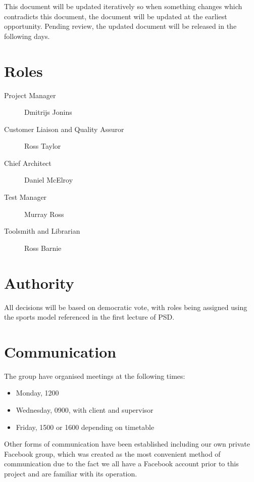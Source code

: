 \documentclass{l3deliverable}
\begin{document}
This document will be updated iteratively so when something changes which
contradicts this document, the document will be updated at the earliest
opportunity.
Pending review, the updated document will be released in the following days.


\section{Roles}

\begin{description}
  \item[Project Manager] Dmitrijs Jonins
  \item[Customer Liaison and Quality Assuror] Ross Taylor
  \item[Chief Architect] Daniel McElroy
  \item[Test Manager] Murray Ross
  \item[Toolsmith and Librarian] Ross Barnie
\end{description}


\section{Authority}

All decisions will be based on democratic vote, with roles being
assigned using the sports model referenced in the first lecture of PSD.


\section{Communication}

The group have organised meetings at the following times:

\begin{itemize}
\item{Monday, 1200}
\item{Wednesday, 0900, with client and supervisor}
\item{Friday, 1500 or 1600 depending on timetable}
\end{itemize}

Other forms of communication have been established including our own
private Facebook group, which was created as the most convenient method
of communication due to the fact we all have a Facebook account prior to
this project and are familiar with its operation.
 
\end{document}
